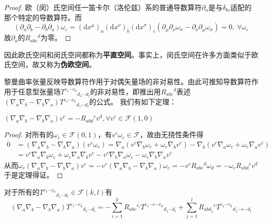 \begin{proof}
欧（闵）氏空间任一笛卡尔（洛伦兹）系的普通导数算符$\partial_a$是与$\delta_{bc}$适配的那个特定的导数算符。而
$$(\partial_a\partial_b - \partial_b\partial_a)\omega_c = (\mathrm{d}x^\mu)_a(\mathrm{d}x^\nu)_b(\mathrm{d}x^\sigma)_c(\partial_\mu\partial_\nu\omega_\sigma - \partial_\nu\partial_\mu\omega_\sigma) = 0, ~ \forall \omega_c$$
故$\partial_a$的$R_{abc}{}^d$为零。
\end{proof}

因此欧氏空间和闵氏空间都称为\textbf{平直空间}。事实上，闵氏空间在许多方面类似于欧氏空间，故又称为\textbf{伪欧空间}。

黎曼曲率张量反映导数算符作用于对偶矢量场的非对易性。由此可推知导数算符作用于任意型张量场$T^{c_1 \cdots c_k}{}_{d_1 \cdots d_l}$的非对易性，即推出用$R_{abc}{}^d$表述$(\nabla_a\nabla_b - \nabla_b\nabla_a)T^{c_1 \cdots c_k}{}_{d_1 \cdots d_l}$的公式。
我们有如下定理：

\begin{theorem}
$(\nabla_a\nabla_b - \nabla_b\nabla_a)v^c = -R_{abd}{}^cv^d, \forall v^c \in \mathscr{F}(1, 0)$
\end{theorem}

\begin{proof}
对所有的$\omega_c \in \mathscr{F}(0, 1)$，有$v^c\omega_c \in \mathscr{F}$，故由无挠性条件得
$$\begin{aligned}
0 & = (\nabla_a\nabla_b - \nabla_b\nabla_a)(v^c\omega_c) = \nabla_a(v^c\nabla_b\omega_c + \omega_c\nabla_bv^c) - \nabla_b(v^c\nabla_a\omega_c + \omega_c\nabla_av^c) \\
& = v^c\nabla_a\nabla_b\omega_c + \omega_c\nabla_a\nabla_bv^c - v^c\nabla_b\nabla_a\omega_c - \omega_c\nabla_b\nabla_av^c
\end{aligned}$$
从而$\omega_c(\nabla_a\nabla_b - \nabla_b\nabla_a)v^c = -v^c(\nabla_a\nabla_b - \nabla_b\nabla_a)\omega_c = -v^cR_{abc}{}^d\omega_d = -\omega_cR_{abd}{}^cv^d$
于是定理得证。
\end{proof}

\begin{theorem}
对于所有的$T^{c_1 \cdots c_k}{}_{d_1 \cdots d_l} \in \mathscr{F}(k, l)$有
$$(\nabla_a\nabla_b - \nabla_b\nabla_a)T^{c_1 \cdots c_k}{}_{d_1 \cdots d_l} = -\sum^k_{i = 1}R_{abe}{}^{c_i}T^{c_1 \cdots e \cdots c_k}{}_{d_1 \cdots d_l} + \sum^l_{j = 1}R_{abd_j}{}^eT^{c_1 \cdots c_k}{}_{d_1 \cdots e \cdots d_l}$$
\end{theorem}


